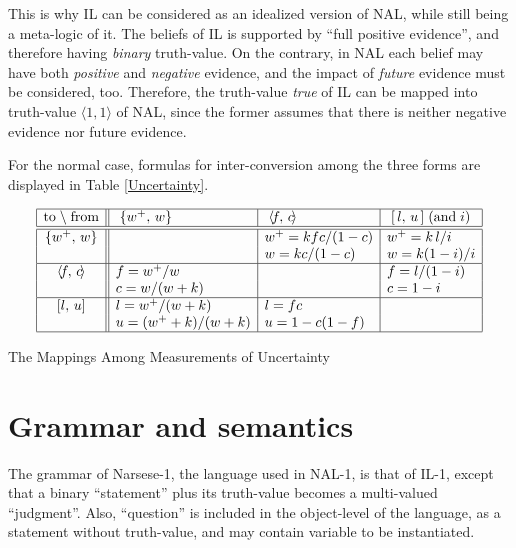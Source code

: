 This is why IL can be considered as an idealized version of NAL, while still being a meta-logic of it.  The beliefs of IL is supported by ``full positive evidence'', and therefore having \emph{binary} truth-value. On the contrary, in NAL each belief may have both \emph{positive} and \emph{negative} evidence, and the impact of \emph{future} evidence must be considered, too. Therefore, the truth-value \emph{true} of IL can be mapped into truth-value \(\langle 1, 1 \rangle\) of NAL, since the former assumes that there is neither negative evidence nor future evidence.

For the normal case, formulas for inter-conversion among the three forms are displayed in Table \ref{Uncertainty}.

\begin{table}[htb]
\[\begin{array}{|c||l|l|l|} \hline
\mbox{to} \; \backslash \; \mbox{from} & \; \{w^+, \, w\} & \; \langle \! f, \, c \!\rangle 
& \; [ \, l, \, u \, ] \; (\mbox{and} \; i) \\
\hline \hline
\{w^+, \, w\} & & w^+ = kfc /(1-c) & w^+ = k \, l/i     \\
              & & w = kc /(1-c)    & w = k(1-i)/i \\
\hline
\langle \!f, \, c\!\rangle    & f = w^+ / w        & & f = l / (1-i) \\
            & c = w / (w+k)         & & c = 1-i           \\
\hline
[l, \, u]   & l = w^+ / (w+k)       & l = fc                  & \\
            & u = (w^++k) / (w+k)     & u = 1 - c (1-f)         & \\
\hline
\end{array}\]
\caption{The Mappings Among Measurements of Uncertainty}
\label{Uncertainty}
\end{table}

\section{Grammar and semantics}

The grammar of Narsese-1, the language used in NAL-1, is that of IL-1, except that a binary ``statement'' plus its truth-value becomes a multi-valued ``judgment''. Also, ``question'' is included in the object-level of the language, as a statement without truth-value, and may contain variable to be instantiated.

